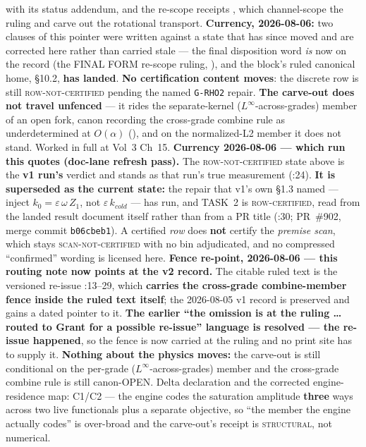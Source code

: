  with its status addendum, and the re-scope receipts , which channel-scope the ruling and carve out the rotational transport. \textbf{Currency, 2026-08-06:} two clauses of this pointer were written against a state that has since moved and are corrected here rather than carried stale --- the final disposition word \emph{is} now on the record (the FINAL FORM re-scope ruling, ), and the block's ruled canonical home,  \S 10.2, \textbf{has landed}. \textbf{No certification content moves}: the discrete row is still \textsc{row-not-certified} pending the named \texttt{G-RHO2} repair. \textbf{The carve-out does not travel unfenced} --- it rides the separate-kernel ($L^\infty$-across-grades) member of an open fork, canon recording the cross-grade combine rule as underdetermined at $O(\alpha)$ (), and on the normalized-L2 member it does not stand. Worked in full at Vol~3 Ch~15. \textbf{Currency 2026-08-06 --- which run this quotes (doc-lane refresh pass).} The \textsc{row-not-certified} state above is the \textbf{v1 run's} verdict and stands as that run's true measurement (:24). \textbf{It is superseded as the current state:} the repair that v1's own \S1.3 named --- inject $k_0 = \varepsilon\,\omega\,Z_1$, not $\varepsilon\,k_{cold}$ --- has run, and TASK~2 is \textsc{row-certified}, read from the landed result document itself rather than from a PR title (:30; PR~\#902, merge commit \texttt{b06cbeb1}). A certified \emph{row} does \textbf{not} certify the \emph{premise scan}, which stays \textsc{scan-not-certified} with no bin adjudicated, and no compressed ``confirmed'' wording is licensed here. \textbf{Fence re-point, 2026-08-06 --- this routing note now points at the v2 record.} The citable ruled text is the versioned re-issue :13--29, which \textbf{carries the cross-grade combine-member fence inside the ruled text itself}; the 2026-08-05 v1 record is preserved and gains a dated pointer to it. \textbf{The earlier ``the omission is at the ruling \ldots routed to Grant for a possible re-issue'' language is resolved --- the re-issue happened}, so the fence is now carried at the ruling and no print site has to supply it. \textbf{Nothing about the physics moves:} the carve-out is still conditional on the per-grade ($L^\infty$-across-grades) member and the cross-grade combine rule is still canon-OPEN. Delta declaration and the corrected engine-residence map:  C1/C2 --- the engine codes the saturation amplitude \textbf{three} ways across two live functionals plus a separate objective, so ``the member the engine actually codes'' is over-broad and the carve-out's receipt is \textsc{structural}, not numerical.

